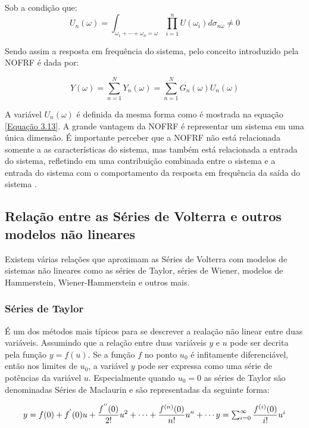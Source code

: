 Sob a condição que:
$$U_{n}(\omega) = \int_{\omega_{1}+\cdots+\omega_{n}=\omega}\prod_{i=1}^{n}U(\omega_{i})d\sigma_{n\omega} \neq 0$$

Sendo assim a resposta em frequência do sistema, pelo conceito introduzido pela NOFRF é dada por:

\begin{equation}
Y(\omega) = \sum_{n=1}^{N} Y_{n}(\omega) = \sum_{n=1}^{N} G_{n}(\omega) U_{n}(\omega)
\label{Equação 3.14}
\end{equation} 

A variável $U_{n}(\omega)$ é definida da mesma forma como é mostrada na equação \ref{Equação 3.13}. A grande vantagem da NOFRF é representar um sistema em uma única dimensão. É importante perceber que a NOFRF não está relacionada somente a as características do sistema, mas também está relacionada a entrada do sistema, refletindo em uma contribuição combinada entre o sistema e a entrada do sistema com o comportamento da resposta em frequência da saída do sistema \cite{cheng2017volterra}.	

\subsection*{Relação entre as Séries de Volterra e outros modelos não lineares}
Existem várias relações que aproximam as Séries de Volterra com modelos de sistemas não lineares como as séries de Taylor, séries de Wiener, modelos de Hammerstein, Wiener-Hammerstein e outros mais.

\subsubsection*{Séries de Taylor}
É um dos métodos mais típicos para se descrever a realação não linear entre duas variáveis. Assumindo que a relação entre duas variáveis $y$ e $u$ pode ser decrita pela função $y = f(u)$. Se a função $f$ no ponto $u_{0}$ é infitamente diferenciável, então nos limites de $u_{0}$, a variável $y$ pode ser expressa como uma série de potências da variável $u$. Especialmente quando $u_{0} = 0$ as séries de Taylor são denominadas Séries de Maclaurin e são representadas da seguinte forma\cite{cheng2017volterra}:

\begin{equation}
y = f(0) + f^{'}(0)u + \dfrac{f^{''}(0)}{2!}u^{2}+\cdots+\dfrac{f^{(n)}(0)}{n!}u^{n}+\cdots$$
$$ y =\sum_{i=0}^{\infty} \dfrac{f^{(i)}(0)}{i!}u^{i}
\label{Equação 4.15}
\end{equation}


